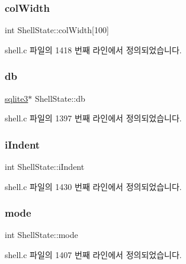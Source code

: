 \subsubsection{\texorpdfstring{col\+Width}{colWidth}}
{\footnotesize\ttfamily int Shell\+State\+::col\+Width\mbox{[}100\mbox{]}}



shell.\+c 파일의 1418 번째 라인에서 정의되었습니다.

\mbox{\label{struct_shell_state_aff5184c68cc62f6db1876cc28ffaf7e0}} 
\subsubsection{\texorpdfstring{db}{db}}
{\footnotesize\ttfamily \hyperlink{sqlite3_8h_a0ef6f2646262c8a9b24368d8ac140f69}{sqlite3}$\ast$ Shell\+State\+::db}



shell.\+c 파일의 1397 번째 라인에서 정의되었습니다.

\mbox{\label{struct_shell_state_a08d5d59ae0d44497aca79e89a5b8f0fe}} 
\subsubsection{\texorpdfstring{i\+Indent}{iIndent}}
{\footnotesize\ttfamily int Shell\+State\+::i\+Indent}



shell.\+c 파일의 1430 번째 라인에서 정의되었습니다.

\mbox{\label{struct_shell_state_a555e4be1ff388f8fb4e71765e4b08ab2}} 
\subsubsection{\texorpdfstring{mode}{mode}}
{\footnotesize\ttfamily int Shell\+State\+::mode}



shell.\+c 파일의 1407 번째 라인에서 정의되었습니다.

\mbox{\label{struct_shell_state_a0afb65c2cd8e373535a1323770db0040}} 
